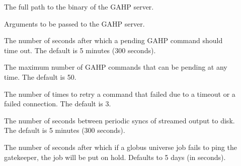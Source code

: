\begin{description}
\item[]
\label{param:Gahp} The full path to the binary of the GAHP server.

\item[]
\label{param:GahpArgs} Arguments to be passed to the GAHP server.

\item[]
\label{param:GridmanagerGahpCallTimeout} The number of seconds after
which a pending GAHP command should time out. The default is 5 minutes
(300 seconds).

\item[]
\label{param:GridmanagerMaxPendingRequests} The maximum number of GAHP
commands that can be pending at any time. The default is 50.

\item[]
\label{param:GridmanagerConnectFailureRetryCount} The number of times
to retry a command that failed due to a timeout or a failed connection.
The default is 3.

\item[]
\label{param:GridmanagerSyncJobIoInterval} The number of seconds between
periodic syncs of streamed output to disk. The default is 5 minutes
(300 seconds).



\item[]
\label{param:GlobusGatekeeperTimeout} The number of seconds after
which if a globus
universe job fails to ping the gatekeeper,
the job will be put on hold.
Defaults to 5 days (in seconds).

\end{description}

